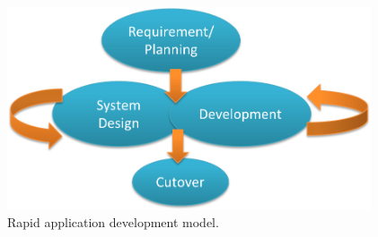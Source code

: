 
\begin{figure}[H]
	\centering
    \includegraphics[height=6cm]{images/design/rad}
    \caption[Rapid application developement]{Rapid application development model.~\protect\footnotemark}
    \label{fig:rad}
\end{figure}

